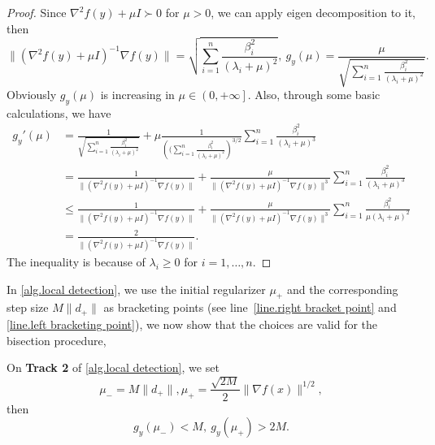 \documentclass{article}
\begin{document}
\begin{proof}
    Since $\nabla^2 f(y)+\mu I \succ 0$ for $\mu>0$, we can apply eigen decomposition to it, then 
    \begin{equation*}
        \|\left (\nabla ^2 f(y)+\mu I \right)^{-1}\nabla f(y)\|=\sqrt{\sum_{i=1}^n \frac{\beta_i^2}{\left (\lambda_i+\mu\right )^2}}, \ g_y(\mu) = \frac{\mu}{\sqrt{\sum_{i=1}^n \frac{\beta_i^2}{\left (\lambda_i+\mu\right )^2}}}.
    \end{equation*}
    Obviously $g_y(\mu)$ is increasing in $\mu \in \left (0,+\infty\right ]$. Also, through some basic calculations, we have
    \begin{equation*}
        \begin{aligned}
            g_y'(\mu) &= \frac{1}{\sqrt{\sum_{i=1}^n \frac{\beta_i^2}{\left (\lambda_i+\mu\right )^2}}}+\mu \frac{1}{\left ( (\sum_{i=1}^n \frac{\beta_i^2}{\left (\lambda_i+\mu\right )^2}\right )^{3/2}}\sum_{i=1}^n\frac{\beta_i^2}{\left (\lambda_i+\mu\right )^3}\\
            &= \frac{1}{\|\left (\nabla ^2 f(y)+\mu I \right)^{-1}\nabla f(y)\|}+\frac{\mu}{\|\left (\nabla ^2 f(y)+\mu I \right)^{-1}\nabla f(y)\|^3}\sum_{i=1}^n\frac{\beta_i^2}{\left (\lambda_i+\mu\right )^3}\\
            &\leq \frac{1}{\|\left (\nabla ^2 f(y)+\mu I \right)^{-1}\nabla f(y)\|}+\frac{\mu}{\|\left (\nabla ^2 f(y)+\mu I \right)^{-1}\nabla f(y)\|^3}\sum_{i=1}^n\frac{\beta_i^2}{\mu\left (\lambda_i+\mu\right )^2}\\
            &=  \frac{2}{\|\left (\nabla ^2 f(y)+\mu I \right)^{-1}\nabla f(y)\|}.
        \end{aligned}
    \end{equation*}
    The inequality is because of $\lambda_i \geq 0$ for $i=1,\ldots,n$.
\end{proof}
In \autoref{alg.local detection}, we use the initial regularizer $\mu_+$ and the corresponding step size $M\|d_+\|$ as bracketing points (see line~\ref{line.right bracket point} and \ref{line.left bracketing point}), we now show that the choices are valid for the bisection procedure,
\begin{lemma}
    \label{eq.valid bracketing}
    On \textbf{Track 2} of \autoref{alg.local detection}, we set
    \begin{equation*}
    \mu_- = M\|d_+\|, \mu_+ = \frac{\sqrt{2M}}{2}\|\nabla f(x)\|^{1/2},
    \end{equation*}
    then 
    \begin{equation*}
        g_y(\mu_-) < M, \ g_y(\mu_+) >2M.
    \end{equation*}
\end{lemma}
\end{document}
